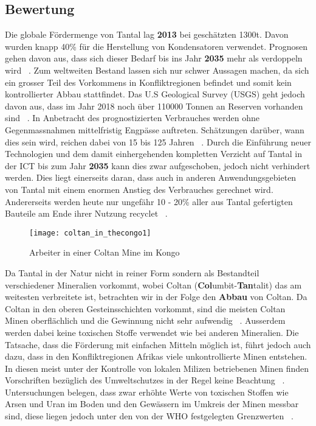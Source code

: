 \subsection{Bewertung}
Die globale Fördermenge von Tantal lag \textbf{2013} bei geschätzten 1300t. Davon wurden
knapp 40\% für die Herstellung von Kondensatoren verwendet. Prognosen gehen
davon aus, dass sich dieser Bedarf bis ins Jahr \textbf{2035} mehr als
verdoppeln wird ~\cite{Weltweit69:online}.
Zum  weltweiten Bestand lassen sich nur schwer Aussagen machen, da sich ein grosser
Teil des Vorkommens in Konfliktregionen befindet und somit kein kontrollierter
Abbau stattfindet. Das U.S Geological Survey (USGS) geht jedoch davon aus, dass
im Jahr 2018 noch über 110000 Tonnen an Reserven vorhanden
sind ~\cite{ober2018mineral}.
In Anbetracht des prognostizierten Verbrauches werden ohne Gegenmassnahmen
mittelfristig Engpässe auftreten. Schätzungen darüber, wann dies sein wird,
reichen dabei von 15 bis 125 Jahren ~\cite{behrendt2007seltene}. Durch die Einführung neuer Technologien und dem
damit einhergehenden kompletten Verzicht auf Tantal in der ICT bis zum Jahr \textbf{2035}  kann dies
zwar aufgeschoben, jedoch nicht verhindert werden. Dies liegt einerseits daran,
dass auch in anderen Anwendungsgebieten von Tantal mit einem enormen Anstieg des
Verbrauches gerechnet wird. Andererseits werden heute nur ungefähr 10 - 20\%
aller aus Tantal gefertigten Bauteile am Ende ihrer Nutzung recyclet ~\cite{behrendt2007seltene}.

\begin{figure}[h]
\centering
\texttt{[image: coltan\_in\_thecongo1]}
\caption{Arbeiter in einer Coltan Mine im Kongo ~\cite{Coltanam17:online}}
\label{}
\end{figure}

Da Tantal in der Natur nicht in reiner Form sondern als Bestandteil verschiedener
Mineralien vorkommt, wobei Coltan (\textbf{Col}umbit-\textbf{Tan}talit) das am
weitesten verbreitete ist, betrachten wir in der Folge den \textbf{Abbau} von Coltan.
Da Coltan in den oberen Gesteinsschichten vorkommt, sind die meisten
Coltan Minen oberflächlich und die Gewinnung nicht sehr
aufwendig ~\cite{reetsch2008effects}. Ausserdem werden dabei keine toxischen
Stoffe verwendet wie bei anderen Mineralien. Die Tatsache, dass die Förderung
mit einfachen Mitteln möglich ist, führt jedoch auch dazu, dass in den
Konfliktregionen Afrikas viele unkontrollierte Minen entstehen. In diesen meist
unter der Kontrolle von lokalen Milizen betriebenen Minen finden Vorschriften
bezüglich des Umweltschutzes in der Regel keine Beachtung ~\cite{bleischwitz2012coltan}.
Untersuchungen belegen, dass zwar erhöhte Werte von toxischen Stoffen wie Arsen
und Uran im Boden und den Gewässern im Umkreis der Minen messbar sind, diese
liegen jedoch unter den von der WHO festgelegten Grenzwerten ~\cite{environmental_management}.

